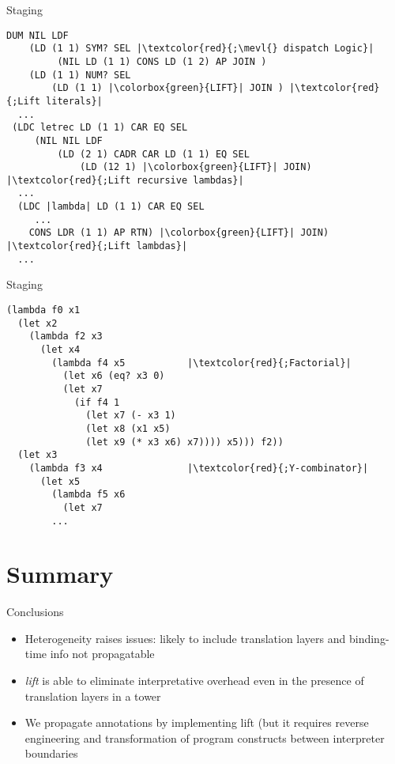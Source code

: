 \documentclass{beamer}
\begin{document}
\begin{frame}[fragile]{Staging \texorpdfstring{\mevl}{}}
         \begin{verbatim}
DUM NIL LDF
    (LD (1 1) SYM? SEL |\textcolor{red}{;\mevl{} dispatch Logic}|
         (NIL LD (1 1) CONS LD (1 2) AP JOIN )
    (LD (1 1) NUM? SEL
        (LD (1 1) |\colorbox{green}{LIFT}| JOIN ) |\textcolor{red}{;Lift literals}|
  ...
 (LDC letrec LD (1 1) CAR EQ SEL
     (NIL NIL LDF
         (LD (2 1) CADR CAR LD (1 1) EQ SEL
             (LD (12 1) |\colorbox{green}{LIFT}| JOIN) |\textcolor{red}{;Lift recursive lambdas}|
  ...
  (LDC |lambda| LD (1 1) CAR EQ SEL
     ...
    CONS LDR (1 1) AP RTN) |\colorbox{green}{LIFT}| JOIN) |\textcolor{red}{;Lift lambdas}|
  ...
         \end{verbatim}
\end{frame}

\begin{frame}[fragile]{Staging \texorpdfstring{\mevl}{}}
     \begin{verbatim}
(lambda f0 x1
  (let x2
    (lambda f2 x3
      (let x4
        (lambda f4 x5           |\textcolor{red}{;Factorial}|
          (let x6 (eq? x3 0)
          (let x7
            (if f4 1
              (let x7 (- x3 1)
              (let x8 (x1 x5)
              (let x9 (* x3 x6) x7)))) x5))) f2))
  (let x3
    (lambda f3 x4               |\textcolor{red}{;Y-combinator}|
      (let x5
        (lambda f5 x6
          (let x7
        ...
         \end{verbatim}
\end{frame}


\section{Summary}
\begin{frame}{Conclusions}
    \begin{itemize}
        \item Heterogeneity raises issues: likely to include translation layers and binding-time info not propagatable
        \item \textit{lift} is able to eliminate interpretative overhead even in the presence of translation layers in a tower
        \item We propagate annotations by implementing lift (but it requires reverse engineering and transformation of program constructs between interpreter boundaries
    \end{itemize}
\end{frame}
\end{document}
